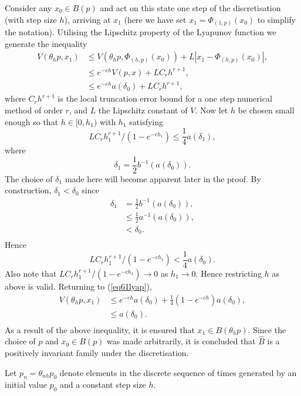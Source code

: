 \begin{prf}
Consider any $x_0 \in B(p)$ and act on this state one step of the
discretisation (with step size $h$), arriving at $x_1$
(here we have set $x_1 = \Phi_{(1,p)}(x_0)$ to simplify the notation).
Utilising the Lipschitz property of the Lyapunov function we generate the
inequality
\begin{align}
  V( \theta_hp, x_1 ) &\leq V( \theta_hp, \Phi_{(h, p)}(x_0) ) + L|x_1 -
            \Phi_{(h, p)}(x_0)|, \nonumber\\
  &\leq e^{-ch} V( p, x ) + LC_rh^{r+1}, \nonumber\\
  &\leq e^{-ch} a( \delta_0 ) + LC_rh^{r+1}, \label{eq61lyap}
\end{align}
where $C_rh^{r+1}$ is the local truncation error bound for a one step numerical
method of order $r$, and $L$ the Lipschitz constant of $V$.
Now let $h$ be chosen
small enough so that $h \in [0, h_1)$ with $h_1$ satisfying
\[ LC_rh_1^{r+1}/(1 - e^{-ch_1}) \leq \frac{1}{4} a ( \delta_1 ), \]
where
\begin{equation}
\label{deltaeq}
\delta_1  = \frac{1}{2}b^{-1}(a(\delta_0)).
\end{equation}
The choice of $\delta_1$ made here will become apparent later in the proof.
By construction, $\delta_1 < \delta_0$ since
\begin{align*}
  \delta_1 &= \frac{1}{2}b^{-1}(a(\delta_0)), \\
  &\leq  \frac{1}{2} a^{-1}(a(\delta_0)), \\
  & < \delta_0. \\
\end{align*}
Hence
\[ LC_rh_1^{r+1}/(1 - e^{-ch_1}) < \frac{1}{4} a ( \delta_0 ). \]
Also note that $LC_rh_1^{r+1}/(1 - e^{-ch_1}) \to 0$ as $h_1 \to 0$. Hence
restricting $h$ as above is valid. Returning to (\ref{eq61lyap}),
\begin{align*}
  V( \theta_hp, x_1 ) &\leq e^{-ch} a( \delta_0 ) + \frac{1}{4}(1
    - e^{-ch}) a( \delta_0), \\
 &\leq a( \delta_0). \\
\end{align*}
As a result of the above inequality, it is ensured that $x_1 \in B(\theta_h p)$.
Since the choice of $p$ and $x_0 \in B(p)$ was made arbitrarily, it is
concluded that $\hat{B}$ is a positively invariant family under the
discretisation.
\end{prf}

Let $p_n = \theta_{nh} p_0$ denote elements in the discrete sequence of times
generated by an initial value $p_0$ and a constant step size $h$.

